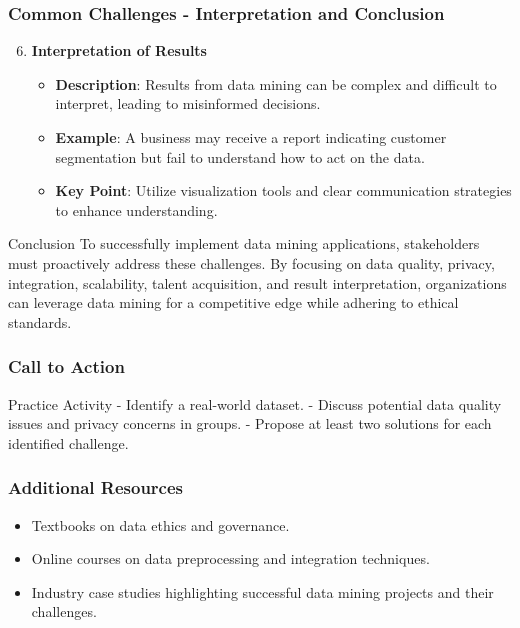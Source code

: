 \documentclass[aspectratio=169]{beamer}
\begin{document}
\begin{frame}[fragile]
    \frametitle{Common Challenges - Interpretation and Conclusion}
    \begin{enumerate}
        \setcounter{enumi}{5}
        \item \textbf{Interpretation of Results}
        \begin{itemize}
            \item \textbf{Description}: Results from data mining can be complex and difficult to interpret, leading to misinformed decisions.
            \item \textbf{Example}: A business may receive a report indicating customer segmentation but fail to understand how to act on the data.
            \item \textbf{Key Point}: Utilize visualization tools and clear communication strategies to enhance understanding.
        \end{itemize}
    \end{enumerate}
    
    \begin{block}{Conclusion}
        To successfully implement data mining applications, stakeholders must proactively address these challenges. By focusing on data quality, privacy, integration, scalability, talent acquisition, and result interpretation, organizations can leverage data mining for a competitive edge while adhering to ethical standards.
    \end{block}
\end{frame}

\begin{frame}[fragile]
    \frametitle{Call to Action}
    \begin{block}{Practice Activity}
        - Identify a real-world dataset. 
        - Discuss potential data quality issues and privacy concerns in groups.
        - Propose at least two solutions for each identified challenge.
    \end{block}
\end{frame}

\begin{frame}[fragile]
    \frametitle{Additional Resources}
    \begin{itemize}
        \item Textbooks on data ethics and governance.
        \item Online courses on data preprocessing and integration techniques.
        \item Industry case studies highlighting successful data mining projects and their challenges.
    \end{itemize}
\end{frame}
\end{document}
